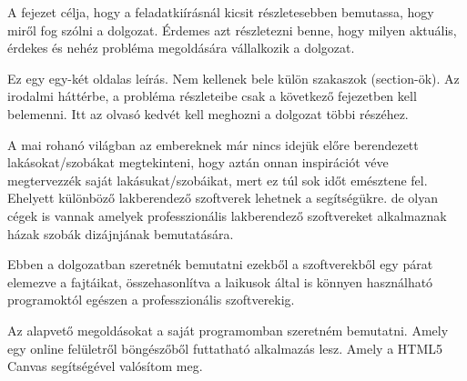 
A fejezet célja, hogy a feladatkiírásnál kicsit részletesebben bemutassa, hogy miről fog szólni a dolgozat.
Érdemes azt részletezni benne, hogy milyen aktuális, érdekes és nehéz probléma megoldására vállalkozik a dolgozat.

Ez egy egy-két oldalas leírás.
Nem kellenek bele külön szakaszok (section-ök).
Az irodalmi háttérbe, a probléma részleteibe csak a következő fejezetben kell belemenni.
Itt az olvasó kedvét kell meghozni a dolgozat többi részéhez.


A mai rohanó világban az embereknek már nincs idejük előre berendezett lakásokat/szobákat megtekinteni, hogy aztán onnan inspirációt véve megtervezzék saját lakásukat/szobáikat, mert ez túl sok időt emésztene fel. Ehelyett különböző lakberendező szoftverek lehetnek a segítségükre. de olyan cégek is vannak amelyek professzionális lakberendező szoftvereket alkalmaznak házak szobák dizájnjának bemutatására.

Ebben a dolgozatban szeretnék bemutatni ezekből a szoftverekből egy párat elemezve a  fajtáikat, összehasonlítva a laikusok által is könnyen használható programoktól egészen a professzionális szoftverekig.

Az alapvető megoldásokat a saját programomban szeretném bemutatni. Amely egy online felületről böngészőből futtatható alkalmazás lesz. Amely a HTML5 Canvas segítségével valósítom meg.

